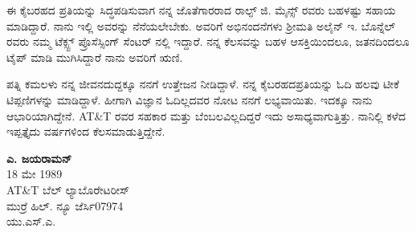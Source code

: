 \eject

ಈ ಕೈಬರಹದ ಪ್ರತಿಯನ್ನು ಸಿದ್ಧಪಡಿಸುವಾಗ ನನ್ನ ಜೊತೆಗಾರರಾದ ರಾಲ್ಫ್ ಜಿ. ಮೈನ್ಸ್ ರವರು ಬಹಳಷ್ಟು ಸಹಾಯ ಮಾಡಿದ್ದಾರೆ. ನಾನು ಇಲ್ಲಿ ಅವರನ್ನು ನೆನೆಯಲೇಬೇಕು. ಅವರಿಗೆ ಅಭಿನಂದನೆಗಳು ಶ್ರೀಮತಿ ಅಲೈನ್ ಇ. ಬೊನ್ನೆಲ್ ರವರು ನಮ್ಮ ಟೆಕ್ಸ್ಟ್ ಪ್ರೊಸೆಸ್ಸಿಂಗ್ ಸೆಂಟರ್ ನಲ್ಲಿ ಇದ್ದಾರೆ. ನನ್ನ ಕೆಲಸವನ್ನು ಬಹಳ ಆಸಕ್ತಿಯಿಂದಲೂ, ಜತನದಿಂದಲೂ ಟೈಪ್ ಮಾಡಿ ಮುಗಿಸಿದ್ದಾರೆ ನಾನು ಅವರಿಗೆ ಋಣಿ.

\medskip

ಪತ್ನಿ ಕಮಲಳು ನನ್ನ ಜೀವನದುದ್ದಕ್ಕೂ ನನಗೆ ಉತ್ತೇಜನ ನೀಡಿದ್ದಾಳೆ. ನನ್ನ ಕೈಬರಹದ\break ಪ್ರತಿಯನ್ನು ಓದಿ ಹಲವು ಟೀಕೆ ಟಿಪ್ಪಣಿಗಳನ್ನು ಮಾಡಿದ್ದಾಳೆ. ಹೀಗಾಗಿ ವಿಜ್ಞಾನ ಓದಿಲ್ಲದವರ ನೋಟ ನನಗೆ ಲಭ್ಯವಾಯಿತು. ಇದಕ್ಕೂ ನಾನು ಆಭಾರಿಯಾಗಿದ್ದೇನೆ. AT\&T ರವರ ಸಹಕಾರ ಮತ್ತು ಬೆಂಬಲವಿಲ್ಲದಿದ್ದರೆ ಇದು ಅಸಾಧ್ಯವಾಗುತ್ತಿತ್ತು. ನಾನಿಲ್ಲಿ ಕಳೆದ ಇಪ್ಪತ್ತೈದು ವರ್ಷಗಳಿಂದ ಕೆಲಸ\break ಮಾಡುತ್ತಿದ್ದೇನೆ.

\begin{flushright}
\textbf{ಎ. ಜಯರಾಮನ್}\\
18 ಮೇ 1989\\
AT\&T ಬೆಲ್ ಲ್ಯಾಬೊರೇಟರೀಸ್\\
ಮುರ್ರೆ ಹಿಲ್. ನ್ಯೂ ಜೆರ್ಸಿ\enginline{-}07974\\
ಯು.ಎಸ್.ಎ.
\end{flushright}
